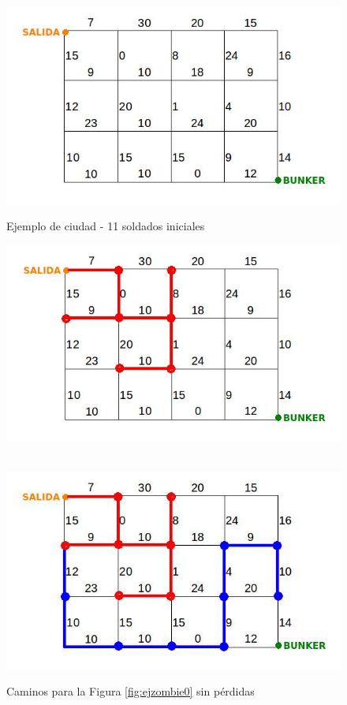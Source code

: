 \begin{figure}[!htb]
  \includegraphics[scale=0.5]{imagenes/ejzombie0.jpeg}
  \caption{Ejemplo de ciudad - 11 soldados iniciales}\label{fig:ejzombie0}
\endminipage
{}
  \includegraphics[scale=0.5]{imagenes/ejzombie1.jpeg}
  \caption{Caminos para la Figura \ref{fig:ejzombie0} sin pérdidas}\label{fig:ejzombie1}
\endminipage\\
  \includegraphics[scale=0.5]{imagenes/ejzombie2.jpeg}

\end{figure}
